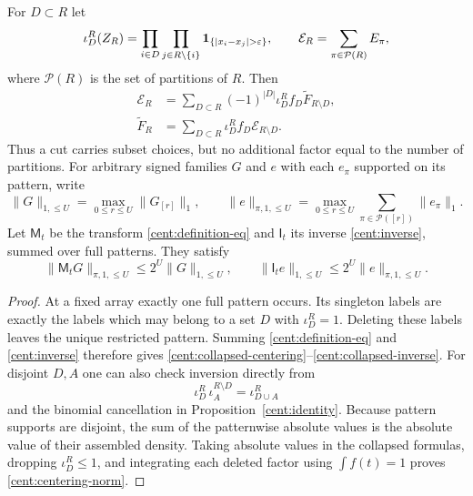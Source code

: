 \begin{corollary}\label{cent:pattern-collapse}
For $D\subset R$ let
\begin{equation}\label{cent:singleton-deletion}
 \iota_D^R(Z_R)
 =\prod_{i\in D}\prod_{j\in R\setminus\{i\}}
       \1_{\{|x_i-x_j|>\eps\}},\qquad
 \mathcal E_R=\sum_{\pi\in\mathcal P(R)}E_\pi,
\end{equation}
where $\mathcal P(R)$ is the set of partitions of $R$. Then
\begin{align}
 \mathcal E_R
 &=\sum_{D\subset R}(-1)^{|D|}\iota_D^R f_D
                       \widetilde F_{R\setminus D},
       \label{cent:collapsed-centering}\\
 \widetilde F_R
 &=\sum_{D\subset R}\iota_D^R f_D
                       \mathcal E_{R\setminus D}.
       \label{cent:collapsed-inverse}
\end{align}
Thus a cut carries subset choices, but no additional factor equal to
the number of partitions. For arbitrary signed families $G$ and $e$
with each $e_\pi$ supported on its pattern, write
\[
 \|G\|_{1,\leq U}=\max_{0\leq r\leq U}\|G_{[r]}\|_1,
 \qquad
 \|e\|_{\pi,1,\leq U}
   =\max_{0\leq r\leq U}\sum_{\pi\in\mathcal P([r])}\|e_\pi\|_1.
\]
Let $\mathsf M_t$ be the transform \eqref{cent:definition-eq} and
$\mathsf I_t$ its inverse \eqref{cent:inverse}, summed over full
patterns. They satisfy
\begin{equation}\label{cent:centering-norm}
 \|\mathsf M_tG\|_{\pi,1,\leq U}\leq2^U\|G\|_{1,\leq U},
 \qquad
 \|\mathsf I_te\|_{1,\leq U}\leq2^U\|e\|_{\pi,1,\leq U}.
\end{equation}
\end{corollary}
\begin{proof}
At a fixed array exactly one full pattern occurs. Its singleton
labels are exactly the labels which may belong to a set $D$ with
$\iota_D^R=1$. Deleting these labels leaves the unique restricted
pattern. Summing \eqref{cent:definition-eq} and
\eqref{cent:inverse} therefore gives
\eqref{cent:collapsed-centering}--\eqref{cent:collapsed-inverse}.
For disjoint $D,A$ one can also check inversion directly from
\[
 \iota_D^R\,\iota_A^{R\setminus D}=\iota_{D\cup A}^R
\]
and the binomial cancellation in Proposition~\ref{cent:identity}.
Because pattern supports are disjoint, the sum of the patternwise
absolute values is the absolute value of their assembled density.
Taking absolute values in the collapsed formulas, dropping
$\iota_D^R\leq1$, and integrating each deleted factor using
$\int f(t)=1$ proves \eqref{cent:centering-norm}.
\end{proof}

